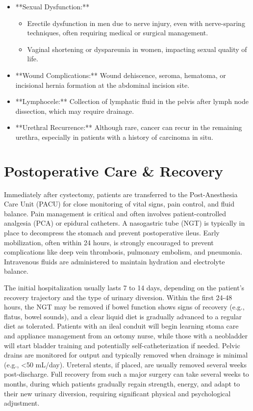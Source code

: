 \begin{itemize}
  \item **Sexual Dysfunction:**
    \begin{itemize}
      \item Erectile dysfunction in men due to nerve injury, even with nerve-sparing techniques, often requiring medical or surgical management.
      \item Vaginal shortening or dyspareunia in women, impacting sexual quality of life.
    \end{itemize}
  
  \item **Wound Complications:** Wound dehiscence, seroma, hematoma, or incisional hernia formation at the abdominal incision site.
  
  \item **Lymphocele:** Collection of lymphatic fluid in the pelvis after lymph node dissection, which may require drainage.
  
  \item **Urethral Recurrence:** Although rare, cancer can recur in the remaining urethra, especially in patients with a history of carcinoma in situ.
\end{itemize}

\section*{Postoperative Care \& Recovery}
Immediately after cystectomy, patients are transferred to the Post-Anesthesia Care Unit (PACU) for close monitoring of vital signs, pain control, and fluid balance. Pain management is critical and often involves patient-controlled analgesia (PCA) or epidural catheters. A nasogastric tube (NGT) is typically in place to decompress the stomach and prevent postoperative ileus. Early mobilization, often within 24 hours, is strongly encouraged to prevent complications like deep vein thrombosis, pulmonary embolism, and pneumonia. Intravenous fluids are administered to maintain hydration and electrolyte balance.

The initial hospitalization usually lasts 7 to 14 days, depending on the patient's recovery trajectory and the type of urinary diversion. Within the first 24-48 hours, the NGT may be removed if bowel function shows signs of recovery (e.g., flatus, bowel sounds), and a clear liquid diet is gradually advanced to a regular diet as tolerated. Patients with an ileal conduit will begin learning stoma care and appliance management from an ostomy nurse, while those with a neobladder will start bladder training and potentially self-catheterization if needed. Pelvic drains are monitored for output and typically removed when drainage is minimal (e.g., <50 mL/day). Ureteral stents, if placed, are usually removed several weeks post-discharge. Full recovery from such a major surgery can take several weeks to months, during which patients gradually regain strength, energy, and adapt to their new urinary diversion, requiring significant physical and psychological adjustment.

